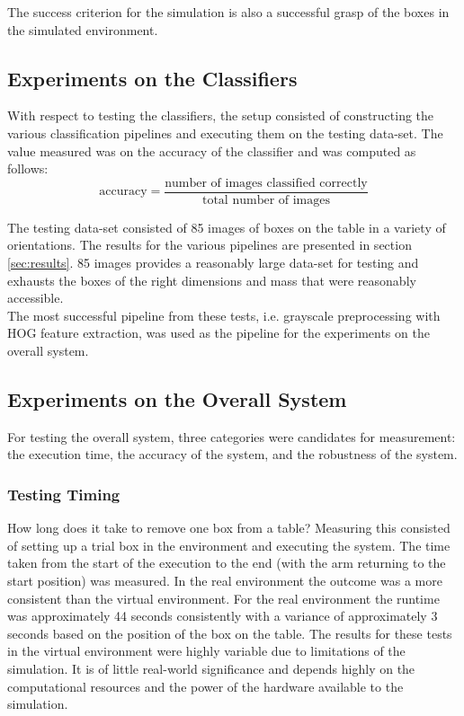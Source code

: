 \documentclass[letterpaper, 10 pt, conference]{conf/ieeeconf}  %
\begin{document}
The success criterion for the simulation is also a successful grasp of the boxes
in the simulated environment.

\subsection{Experiments on the Classifiers}
With respect to testing the classifiers, the setup consisted of constructing the
various classification pipelines and executing them on the testing data-set. The
value measured was on the accuracy of the classifier and was computed as
follows:
\begin{equation*}
  \text{accuracy} = \dfrac{\text{number of images classified correctly}}{\text{total number of images}}
\end{equation*}

The testing data-set consisted of 85 images of boxes on the table in a variety
of orientations. The results for the various pipelines are presented in section
\ref{sec:results}. 85 images provides a reasonably large data-set for testing
and exhausts the boxes of the right dimensions and mass that were reasonably
accessible.\\

The most successful pipeline from these tests, i.e. grayscale preprocessing with
HOG feature extraction, was used as the pipeline for the experiments on the
overall system.

\subsection{Experiments on the Overall System}
For testing the overall system, three categories were candidates for
measurement: the execution time, the accuracy of the system, and the robustness
of the system.\\
\subsubsection{Testing Timing}
How long does it take to remove one box from a table? Measuring this consisted
of setting up a trial box in the environment and executing the system. The time
taken from the start of the execution to the end (with the arm returning to the
start position) was measured. In the real environment the outcome was a more
consistent than the virtual environment. For the real environment the runtime
was approximately 44 seconds consistently with a variance of approximately 3
seconds based on the position of the box on the table. The results for these
tests in the virtual environment were highly variable due to limitations of the
simulation. It is of little real-world significance and depends highly on the
computational resources and the power of the hardware available to the
simulation.\\
\end{document}
